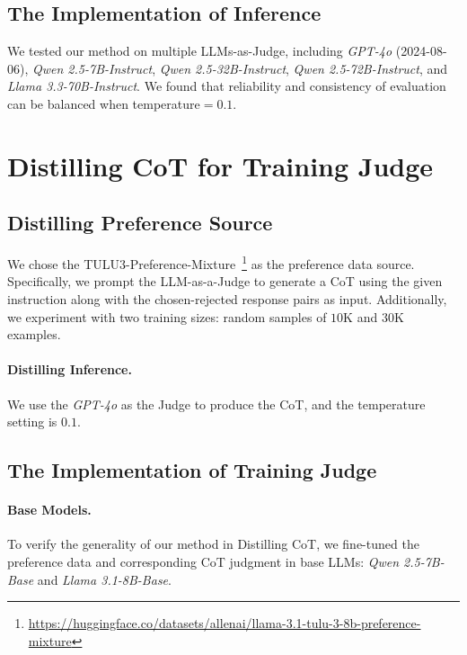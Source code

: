 \subsection{The Implementation of Inference}
\label{subsec:implementation_inference}

We tested our method on multiple LLMs-as-Judge, including \textit{GPT-4o} (2024-08-06), \textit{Qwen 2.5-7B-Instruct}, \textit{Qwen 2.5-32B-Instruct}, \textit{Qwen 2.5-72B-Instruct}, and \textit{Llama 3.3-70B-Instruct}. We found that reliability and consistency of evaluation can be balanced when temperature$=0.1$.


\section{Distilling CoT for Training Judge}
\label{sec:distilling4training}

\subsection{Distilling Preference Source}
\label{subsec:distilsource}
We chose the TULU3-Preference-Mixture~\footnote{\url{https://huggingface.co/datasets/allenai/llama-3.1-tulu-3-8b-preference-mixture}} as the preference data source. Specifically, we prompt the LLM-as-a-Judge to generate a CoT using the given instruction along with the chosen-rejected response pairs as input. Additionally, we experiment with two training sizes: random samples of $10$K and $30$K examples.

\paragraph{Distilling Inference.} We use the \textit{GPT-4o} as the Judge to produce the CoT, and the temperature setting is $0.1$. 

\subsection{The Implementation of Training Judge}
\label{subsec:implementation_trainingjudge}

\paragraph{Base Models.} To verify the generality of our method in Distilling CoT, we fine-tuned the preference data and corresponding CoT judgment in base LLMs: \textit{Qwen 2.5-7B-Base} and \textit{Llama 3.1-8B-Base}.

